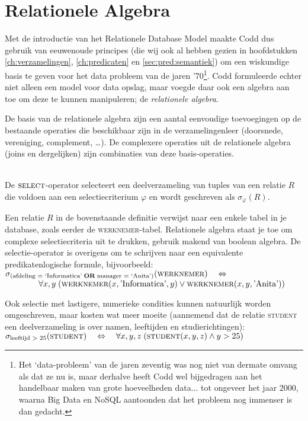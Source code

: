 \section{Relationele Algebra}
Met de introductie van het Relationele Database Model maakte Codd dus gebruik van eeuwenoude principes (die wij ook al hebben gezien in hoofdstukken \ref{ch:verzamelingen}, \ref{ch:predicaten} en \ref{sec:pred:semantiek}) om een wiskundige basis te geven voor het data probleem van de jaren '70\footnote{Het `data-probleem' van de jaren zeventig was nog niet van dermate omvang als dat ze nu is, maar derhalve heeft Codd wel bijgedragen aan het handelbaar maken van grote hoeveelheden data... tot ongeveer het jaar 2000, waarna Big Data en NoSQL aantoonden dat het probleem nog immenser is dan gedacht.}. Codd formuleerde echter niet alleen een model voor data opslag, maar voegde daar ook een algebra aan toe om deze te kunnen manipuleren; de \textit{relationele algebra}.

De basis van de relationele algebra zijn een aantal eenvoudige toevoegingen op de bestaande operaties die beschikbaar zijn in de verzamelingenleer (doorsnede, vereniging, complement, \ldots). De complexere operaties uit de relationele algebra (joins en dergelijken) zijn combinaties van deze basis-operaties.

\begin{definition}[Selectie]\mbox{}\\
De $\mathsf{\textsc{select}}$-operator selecteert een deelverzameling van tuples van een relatie $R$ die voldoen aan een selectiecriterium $\varphi$ en wordt geschreven als $\sigma_\varphi(R)$.
\end{definition}
Een relatie $R$ in de bovenstaande definitie verwijst naar een enkele tabel in je database, zoals eerder de \textsc{werknemer}-tabel. Relationele algebra staat je toe om complexe selectiecriteria uit te drukken, gebruik makend van boolean algebra. De selectie-operator is overigens om te schrijven naar een equivalente predikatenlogische formule, bijvoorbeeld:\\[2.5pt]
$\sigma_{(\text{afdeling = `Informatica'}\;\mathbf{OR}\;\text{manager = `Anita'})}(\textsc{werknemer})\quad\Leftrightarrow$\\
$\mathtt{ }\qquad\qquad\forall x,y\;(\textsc{werknemer}(x,\text{'Informatica'},y)\vee\textsc{werknemer}(x,y,\text{'Anita'}))$

\noindent Ook selectie met lastigere, numerieke condities kunnen natuurlijk worden omgeschreven, maar kosten wat meer moeite (aannemend dat de relatie \textsc{student} een deelverzameling is over namen, leeftijden en studierichtingen):\\[2.5pt]
$\sigma_{\text{leeftijd > 25}}(\textsc{student})\quad\Leftrightarrow\quad\forall x,y,z\;(\textsc{student}(x, y, z) \wedge y > 25)$

